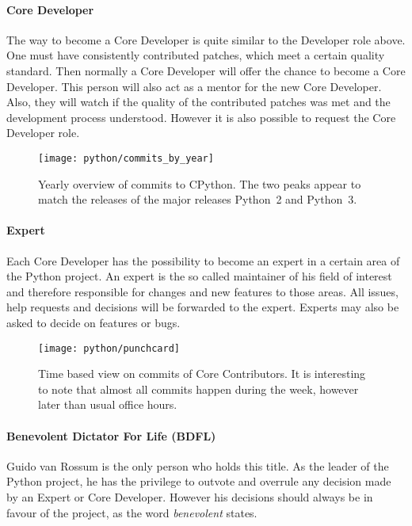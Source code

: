 \paragraph{Core Developer}

The way to become a Core Developer is quite similar to the Developer role
above. One must have consistently contributed patches, which meet a certain
quality standard. Then normally a Core Developer will offer the chance to
become a Core Developer. This person will also act as a mentor for the new Core
Developer. Also, they will watch if the quality of the contributed patches was
met and the development process understood. However it is also possible to
request the Core Developer role.

\begin{figure}[htbp]
  \centering
  \texttt{[image: python/commits\_by\_year]}
  \caption{Yearly overview of commits to CPython. The two peaks appear to match
  the releases of the major releases Python~2 and Python~3.}
\end{figure}

\paragraph{Expert}

Each Core Developer has the possibility to become an expert in a certain area
of the Python project. An expert is the so called maintainer of his field of
interest and therefore responsible for changes and new features to those areas.
All issues, help requests and decisions will be forwarded to the expert.
Experts may also be asked to decide on features or bugs.

\begin{figure}[hbtp]
  \centering
  \texttt{[image: python/punchcard]}
  \caption{Time based view on commits of Core Contributors. It is interesting
  to note that almost all commits happen during the week, however later than
  usual office hours.}
\end{figure}

\paragraph{Benevolent Dictator For Life (BDFL)}

Guido van Rossum is the only person who holds this title. As the leader of the
Python project, he has the privilege to outvote and overrule any decision made
by an Expert or Core Developer. However his decisions should always be in
favour of the project, as the word \emph{benevolent} states.


